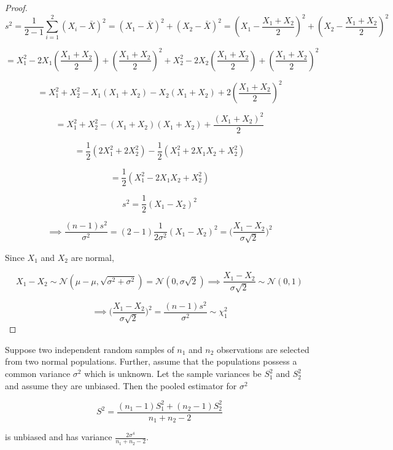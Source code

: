 \begin{proof}

\[
s^2 = \frac{1}{2-1}\sum_{i=1}^2(X_i - \bar{X})^2  = (X_1 - \bar{X})^2 + (X_2 - \bar{X})^2 = (X_1 - \frac{X_1 + X_2}{2})^2 +  (X_2 - \frac{X_1 + X_2}{2})^2
\]

\[
= X_1^2 - 2X_1(\frac{X_1 + X_2}{2}) + (\frac{X_1 + X_2}{2})^2 + X_2^2 - 2X_2(\frac{X_1 + X_2}{2}) + (\frac{X_1 + X_2}{2})^2
\]

\[
= X_1^2 +  X_2^2  - X_1(X_1 + X_2)  - X_2(X_1 + X_2) + 2(\frac{X_1 + X_2}{2})^2
\]

\[
= X_1^2 + X_2^2 - (X_1 + X_2)(X_1 + X_2) + \frac{(X_1 + X_2)^2}{2}
\]

\[
= \frac{1}{2}(2X_1^2 + 2X_2^2) - \frac{1}{2}(X_1^2 + 2X_1 X_2 + X_2^2)
\]

\[
= \frac{1}{2}(X_1^2 - 2X_1 X_2 + X_2^2)
\]

\[
\boxed{
s^2 = \frac{1}{2}(X_1 - X_2)^2}
\]

\[
\implies \frac{(n-1)s^2}{\sigma^2} = (2-1)\frac{1}{2\sigma^2}(X_1 - X_2)^2 = \bigg(\frac{X_1-X_2}{\sigma \sqrt{2}} \bigg)^2
\]

Since \(X_1\) and \(X_2\) are normal, 

\[
X_1 - X_2 \sim \mathcal{N}(\mu - \mu, \sqrt{\sigma^2 + \sigma^2}) = \mathcal{N}(0, \sigma\sqrt{2}) \implies \frac{X_1 - X_2}{\sigma \sqrt{2}} \sim \mathcal{N}(0, 1)
\]

\[
\implies \bigg(\frac{X_1-X_2}{\sigma \sqrt{2}} \bigg)^2 = \boxed{\frac{(n-1)s^2}{\sigma^2} \sim \chi_1^2}
\]


\end{proof}

\begin{proposition} Suppose two independent random samples of \(n_1\) and \(n_2\) observations are selected from two normal populations. Further, assume that the populations possess a common variance \(\sigma^2\) which is unknown. Let the sample variances be \(S_1^2\) and \(S_2^2\) and assume they are unbiased. Then the pooled estimator for \(\sigma^2\)

\[
S^2 = \frac{(n_1 - 1)S_1^2 + (n_2 - 1)S_2^2}{n_1 + n_2 - 2}
\]

is unbiased and has variance \( \frac{2 \sigma^4}{n_1 + n_2 -2}\).

\end{proposition}

